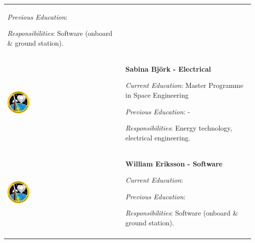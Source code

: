\begin{longtable}[]{m{} m{}}
\smallskip
\textit{Previous Education}:

\smallskip
\textit{Responsibilities}: Software (onboard \& ground station).
\bigskip
\\

\includegraphics[width=0.2\textwidth]{0-cover/img/logo-rexus-bexus.png}  & \textbf{Sabina Bj\"ork - Electrical}

\smallskip
\textit{Current Education}: Master Programme in Space Engineering

\smallskip
\textit{Previous Education}: -

\smallskip
\textit{Responsibilities}: Energy technology, electrical engineering.
\bigskip
\\

\includegraphics[width=0.2\textwidth]{0-cover/img/logo-rexus-bexus.png}  & \textbf{William Eriksson - Software}

\smallskip
\textit{Current Education}:

\smallskip
\textit{Previous Education}:

\smallskip
\textit{Responsibilities}: Software (onboard \& ground station).
\bigskip
\\

\label{tab:people}
\end{longtable}
\raggedbottom
